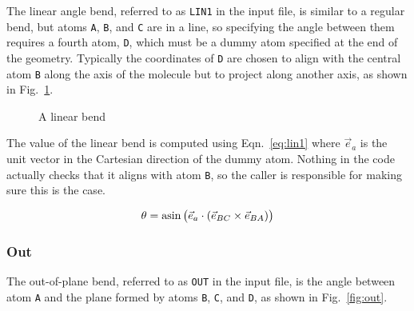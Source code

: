\documentclass{article}
\begin{document}
The linear angle bend, referred to as \verb|LIN1| in the input file, is similar
to a regular bend, but atoms \verb|A|, \verb|B|, and \verb|C| are in a line, so
specifying the angle between them requires a fourth atom, \verb|D|, which must
be a dummy atom specified at the end of the geometry. Typically the coordinates
of \verb|D| are chosen to align with the central atom \verb|B| along the axis of
the molecule but to project along another axis, as shown in Fig.~\ref{fig:lin1}.

\begin{figure}[ht]
  \centering
  \caption{A linear bend}
  \label{fig:lin1}

\end{figure}

The value of the linear bend is computed using Eqn.~\ref{eq:lin1} where
$\vec{e}_a$ is the unit vector in the Cartesian direction of the dummy atom.
Nothing in the code actually checks that it aligns with atom \verb|B|, so the
caller is responsible for making sure this is the case.

\begin{equation}
  \label{eq:lin1}
  \theta = \asin \big( \vec{e}_a \cdot (\vec{e}_{BC} \times \vec{e}_{BA}) \big)
\end{equation}

\subsubsection{Out}
\label{sec:out}

The out-of-plane bend, referred to as \verb|OUT| in the input file, is the angle
between atom \verb|A| and the plane formed by atoms \verb|B|, \verb|C|, and
\verb|D|, as shown in Fig.~\ref{fig:out}.
\end{document}
